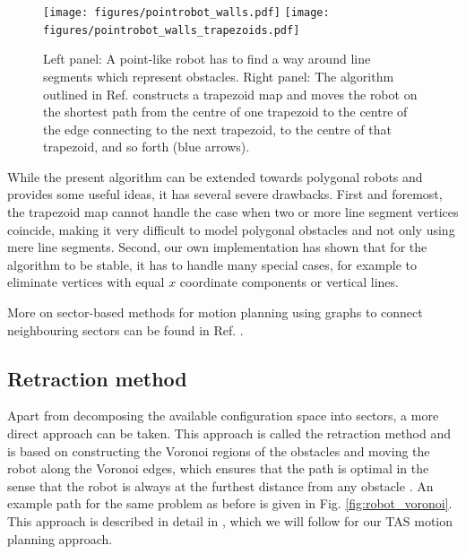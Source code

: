 \begin{figure}[htb]
	\centering
	\texttt{[image: figures/pointrobot\_walls.pdf]}
	\hspace{1 cm}
	\texttt{[image: figures/pointrobot\_walls\_trapezoids.pdf]}
	\caption[Pathfinding using trapezoid maps.]{
		Left panel: A point-like robot has to find a way around line segments 
		which represent obstacles. 
		Right panel: The algorithm outlined in Ref. \cite[p. 289]{Berg2008} 
		constructs a trapezoid map and moves the robot on the shortest path from 
		the centre of one trapezoid to the centre of the edge connecting to the 
		next trapezoid, to the centre of that trapezoid, and so forth (blue arrows).}
	\label{fig:robot_trapezoids}
\end{figure}

While the present algorithm can be extended towards polygonal robots \cite[Ch. 13.3, pp. 290-297]{Berg2008} 
and provides some useful ideas, it has several severe drawbacks. First and 
foremost, the trapezoid map cannot handle the case when two or more line segment 
vertices coincide, making it very difficult to model polygonal obstacles and not 
only using mere line segments. Second, our own implementation has shown that for 
the algorithm to be stable, it has to handle many special cases, for example to 
eliminate vertices with equal $x$ coordinate components or vertical lines.

More on sector-based methods for motion planning using graphs to connect neighbouring
sectors can be found in Ref. \cite{Choset2010_ch6}.

\vspace{0.5cm}

\subsection{Retraction method}
Apart from decomposing the available configuration space into sectors, a more 
direct approach can be taken. 
This approach is called the retraction method and is based on constructing the 
Voronoi regions of the obstacles and moving the robot along the Voronoi edges, 
which ensures that the path is optimal in the sense that the robot is always at 
the furthest distance from any obstacle \cite[pp. 163 and 304]{Berg2008}.
An example path for the same problem as before is given in Fig. \ref{fig:robot_voronoi}.
This approach is described in detail in \cite[Ch. 5.4.3, pp. 247-251]{FUH_geo2020}, which
we will follow for our TAS motion planning approach.

